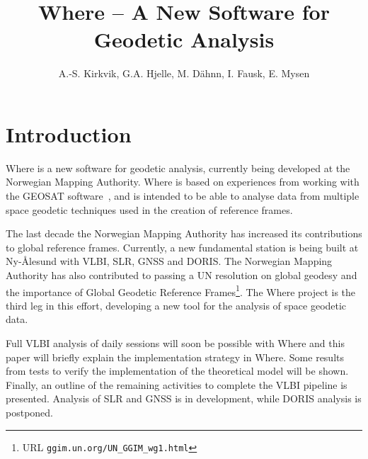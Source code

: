 \documentclass[natbib,twocolumn,twoside]{svmultiag}
\title*{Where -- A New Software for Geodetic Analysis}
\author{A.-S. Kirkvik, G.A. Hjelle, M. D\"ahnn, I. Fausk, E. Mysen}
\institute{Ann-Silje Kirkvik, Geir Arne Hjelle, Michael D\"ahnn, Ingrid Fausk,
  Eirik Mysen \at Norwegian Mapping Authority, Geodetic Institute,
  Kartverksveien 21, 3511 H{\o}nefoss, Norway
}
\begin{document}
\maketitle



\section{Introduction}                                \label{sec:introduction}
Where is a new software for geodetic analysis, currently being developed at the
Norwegian Mapping Authority. Where is based on experiences from working with the
GEOSAT software~\citep{kierulf2010}, and is intended to be able to analyse data
from multiple space geodetic techniques used in the creation of reference
frames.

The last decade the Norwegian Mapping Authority has increased its contributions
to global reference frames. Currently, a new fundamental station is being built
at Ny-{\AA}lesund with VLBI, SLR, GNSS and DORIS. The Norwegian Mapping
Authority has also contributed to passing a UN resolution on global geodesy and
the importance of Global Geodetic Reference Frames\footnote{URL
  \texttt{ggim.un.org/UN\_GGIM\_wg1.html}}. The Where project is the third leg
in this effort, developing a new tool for the analysis of space geodetic data.

Full VLBI analysis of daily sessions will soon be possible with Where and this
paper will briefly explain the implementation strategy in Where. Some results
from tests to verify the implementation of the theoretical model will be
shown. Finally, an outline of the remaining activities to complete the VLBI
pipeline is presented. Analysis of SLR and GNSS is in development, while
DORIS analysis is postponed.
\end{document}
